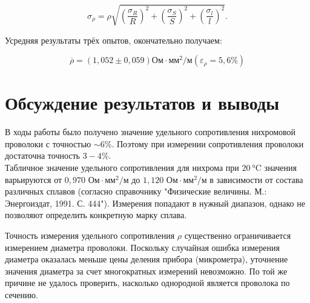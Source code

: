 \documentclass[a4paper,12pt]{article} %
\begin{document}
\begin{equation}
\sigma_\rho = \rho \sqrt{\left( \frac{\sigma_R}{R}  \right)^2 + \left( \frac{\sigma_S}{S} \right) ^2 + \left( \frac{\sigma_l}{l} \right) ^2 }.
\end{equation}



Усредняя результаты трёх опытов, окончательно получаем:

\begin{equation}
\overline{\rho} = \left( 1,052 \pm 0,059 \right) \text{Ом} \cdot \text{мм}^2 / \text{м} \left( \varepsilon_\rho = 5,6 \% \right) 
\end{equation}

\section{Обсуждение результатов и выводы}

В ходы работы было получено значение удельного сопротивления нихромовой проволоки с точностью $ \sim 6 \% $. Поэтому при измерении сопротивления проволоки достаточна точность $ 3-4 \% $. \\
Табличное значение удельного сопротивления для нихрома при $ \SI{20}{\degreeCelsius} $ значения варьируются от $ 0,970 \text{ Ом} \cdot \text{мм}^2 / \text{м} $ до $ 1,120 \text{ Ом} \cdot \text{мм}^2 / \text{м} $ в зависимости от состава различных сплавов (согласно справочнику "Физические величины. М.: Энергоиздат, 1991. С. 444"). Измерения попадают в нужный диапазон, однако не позволяют определить конкретную марку сплава.

\medskip

\noindent 
Точность измерения удельного сопротивления $ \rho $ существенно ограничивается измерением
диаметра проволоки. Поскольку случайная ошибка измерения диаметра оказалась меньше
цены деления прибора (микрометра), уточнение значения диаметра за счет многократных измерений невозможно. По той же причине не удалось проверить, насколько однородной является проволока по сечению.
	
	
	
	
	
	
\end{document}
